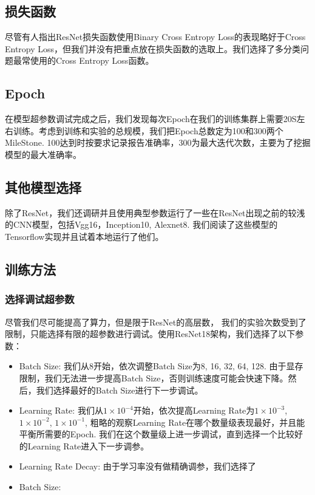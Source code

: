\documentclass[UTF8,12pt]{article} %
\theoremstyle{definition}
\begin{document}
\subsection {损失函数}
尽管有人指出\cite{beyer2020imagenet}ResNet损失函数使用Binary Cross Entropy Loss的表现略好于Cross Entropy Loss，但我们并没有把重点放在损失函数的选取上。我们选择了多分类问题最常使用的Cross Entropy Loss函数。

\subsection{Epoch}
在模型超参数调试完成之后，我们发现每次Epoch在我们的训练集群上需要20S左右训练。考虑到训练和实验的总规模，我们把Epoch总数定为100和300两个MileStone. 100达到时按要求记录报告准确率，300为最大迭代次数，主要为了挖掘模型的最大准确率。

\subsection{其他模型选择}
除了ResNet，我们还调研并且使用典型参数运行了一些在ResNet出现之前的较浅的CNN模型，包括Vgg16，Inception10, Alexnet8. 我们阅读了这些模型的Tensorflow实现并且试着本地运行了他们。

\subsection{训练方法}
\subsubsection{选择调试超参数}
尽管我们尽可能提高了算力，但是限于ResNet的高层数， 我们的实验次数受到了限制，只能选择有限的超参数进行调试。使用ResNet18架构，我们选择了以下参数：
\begin{itemize}
	\item Batch Size: 我们从8开始，依次调整Batch Size为8, 16, 32, 64, 128. 由于显存限制，我们无法进一步提高Batch Size，否则训练速度可能会快速下降。然后，我们选择最好的Batch Size进行下一步调试。
	\item Learning Rate: 我们从$1 \times 10^{-4}$开始，依次提高Learning Rate为$1 \times 10^{-3}$, $1 \times 10^{-2}$, $1 \times 10^{-1}$, 粗略的观察Learning Rate在哪个数量级表现最好，并且能平衡所需要的Epoch. 我们在这个数量级上进一步调试，直到选择一个比较好的Learning Rate进入下一步调参。
	\item Learning Rate Decay: 由于学习率没有做精确调参，我们选择了 
	\item Batch Size: 
\end{itemize}
\end{document}
